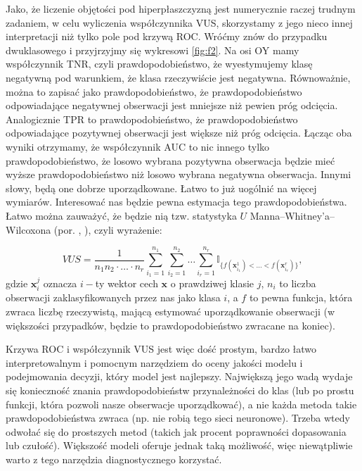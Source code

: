 \documentclass{mini}
\begin{document}
Jako, że liczenie objętości pod hiperpłaszczyzną jest numerycznie raczej trudnym zadaniem, w celu wyliczenia współczynnika VUS, skorzystamy z jego nieco innej interpretacji niż tylko pole pod krzywą ROC. Wróćmy znów do przypadku dwuklasowego i przyjrzyjmy się wykresowi \ref{fig:f2}. Na osi OY mamy współczynnik TNR, czyli prawdopodobieństwo, że wyestymujemy klasę negatywną pod warunkiem, że klasa rzeczywiście jest negatywna. Równoważnie, można to zapisać jako prawdopodobieństwo, że prawdopodobieństwo odpowiadające negatywnej obserwacji jest mniejsze niż pewien próg odcięcia. Analogicznie TPR to prawdopodobieństwo, że prawdopodobieństwo odpowiadające pozytywnej obserwacji jest większe niż próg odcięcia. Łącząc oba wyniki otrzymamy, że współczynnik AUC to nic innego tylko prawdopodobieństwo, że losowo wybrana pozytywna obserwacja będzie mieć wyższe prawdopodobieństwo niż losowo wybrana negatywna obserwacja. Innymi słowy, będą one dobrze uporządkowane. Łatwo to już uogólnić na więcej wymiarów. Interesować nas będzie pewna estymacja tego prawdopodobieństwa. Łatwo można zauważyć, że będzie nią tzw. statystyka $U$  Manna–Whitney'a–Wilcoxona (por. \cite{roc1}, \cite{roc2}), czyli wyrażenie:

\begin{equation}\label{dop3}
VUS = \dfrac{1}{n_1n_2\cdot\ldots\cdot n_r}\sum_{i_1=1}^{n_1}\sum_{i_2=1}^{n_2}\ldots\sum_{i_r=1}^{n_r}\mathbb{I}_{\lbrace f(\mathbf{x}_{i_1}^1)<\ldots<f(\mathbf{x}_{i_r}^r)\rbrace},
\end{equation}
gdzie $\textbf{x}_i^j$ oznacza $i-$ty wektor cech $\mathbf{x}$ o prawdziwej klasie $j$, $n_i$ to liczba obserwacji zaklasyfikowanych przez nas jako klasa $i$, a $f$ to pewna funkcja, która zwraca liczbę rzeczywistą, mającą estymować uporządkowanie obserwacji (w większości przypadków, będzie to prawdopodobieństwo zwracane na koniec).

Krzywa ROC i współczynnik VUS jest więc dość prostym, bardzo łatwo interpretowalnym i pomocnym narzędziem do oceny jakości modelu i podejmowania decyzji, który model jest najlepszy. Największą jego wadą wydaje się konieczność znania prawdopodobieństw przynależności do klas (lub po prostu funkcji, która pozwoli nasze obserwacje uporządkować), a nie każda metoda takie prawdopodobieństwa zwraca (np. nie robią tego sieci neuronowe). Trzeba wtedy odwołać się do prostszych metod (takich jak procent poprawności dopasowania lub czułość). Większość modeli oferuje jednak taką możliwość, więc niewątpliwie warto z tego narzędzia diagnostycznego korzystać.
\end{document}
